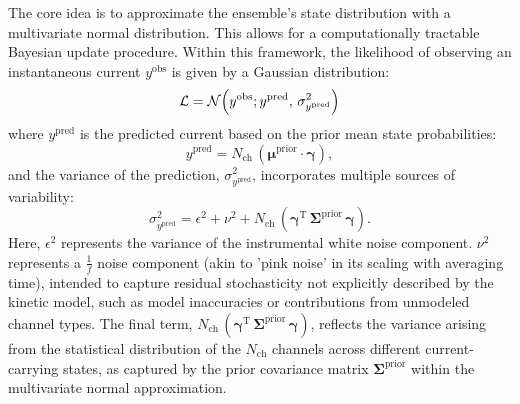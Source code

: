 \documentclass[pdflatex,sn-nature]{sn-jnl}%
\begin{document}
The core idea is to approximate the ensemble's state distribution with a multivariate normal distribution. This allows for a computationally tractable Bayesian update procedure. Within this framework, the likelihood of observing an instantaneous current \( y^{\text{obs}} \) is given by a Gaussian distribution:
\begin{equation}
	\mathcal{L} = \mathcal{N}\Bigl( y^{\text{obs}} ; y^{\text{pred}},\, \sigma^2_{y^{\text{pred}}} \Bigr)
	\label{eq:macro_likelihood}
\end{equation}
where \( y^{\text{pred}} \) is the predicted current based on the prior mean state probabilities:
\begin{equation}
	y^{\text{pred}} = N_{\text{ch}}\, (\boldsymbol{\mu}^{\text{prior}} \cdot \boldsymbol{\gamma}),
	\label{eq:macro_predicted_y} %
\end{equation}
and the variance of the prediction, \( \sigma^2_{y^{\text{pred}}} \), incorporates multiple sources of variability:
\begin{equation}
	\sigma^2_{y^{\text{pred}}} = \epsilon^2 + \nu^2 + N_{\text{ch}}\, (\boldsymbol{\gamma}^{\mathrm{T}}\, \boldsymbol{\Sigma}^{\text{prior}}\, \boldsymbol{\gamma}).
	\label{eq:macro_sigma_pred} %
\end{equation}
Here, \(\epsilon^2\) represents the variance of the instrumental white noise component. \(\nu^2\) represents a $\frac{1}{f}$ noise component (akin to 'pink noise' in its scaling with averaging time), intended to capture residual stochasticity not explicitly described by the kinetic model, such as model inaccuracies or contributions from unmodeled channel types. The final term, \( N_{\text{ch}}\, (\boldsymbol{\gamma}^{\mathrm{T}}\, \boldsymbol{\Sigma}^{\text{prior}}\, \boldsymbol{\gamma}) \), reflects the variance arising from the statistical distribution of the \(N_{\text{ch}}\) channels across different current-carrying states, as captured by the prior covariance matrix \( \boldsymbol{\Sigma}^{\text{prior}} \) within the multivariate normal approximation.
\end{document}
